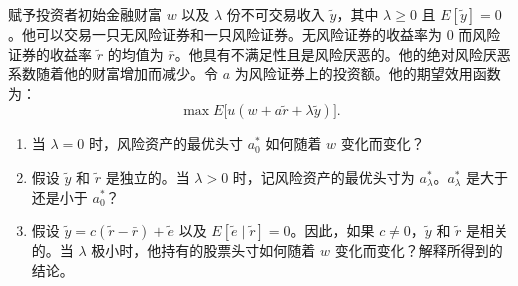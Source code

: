 \begin{samepage}
\begin{problem}
 赋予投资者初始金融财富 $w$ 以及 $\lambda$ 份不可交易收入 $\tilde{y}$，其中 $\lambda\ge 0$ 且 $E[\tilde{y}]=0$。他可以交易一只无风险证券和一只风险证券。无风险证券的收益率为 0 而风险证券的收益率 $\tilde{r}$ 的均值为 $\bar{r}$。他具有不满足性且是风险厌恶的。他的绝对风险厌恶系数随着他的财富增加而减少。令 $a$ 为风险证券上的投资额。他的期望效用函数为：
\[
    \max E\bigl[u(w+a\tilde{r}+\lambda\tilde{y})\bigr].
\]
\begin{enumerate}[label=(\alph*)]
    \item 当 $\lambda=0$ 时，风险资产的最优头寸 $a_{0}^{*}$ 如何随着 $w$ 变化而变化？
    \item 假设 $\tilde{y}$ 和 $\tilde{r}$ 是独立的。当 $\lambda>0$ 时，记风险资产的最优头寸为 $a_{\lambda}^{*}$。$a_{\lambda}^{*}$ 是大于还是小于 $a_{0}^{*}$？
    \item 假设 $\tilde{y}=c(\tilde{r}-\bar{r})+\tilde e$ 以及 $E[\tilde e\mid\tilde{r}]=0$。因此，如果 $c\neq 0$，$\tilde{y}$ 和 $\tilde{r}$ 是相关的。当 $\lambda$ 极小时，他持有的股票头寸如何随着 $w$ 变化而变化？解释所得到的结论。
\end{enumerate}
\end{problem}
\end{samepage}
